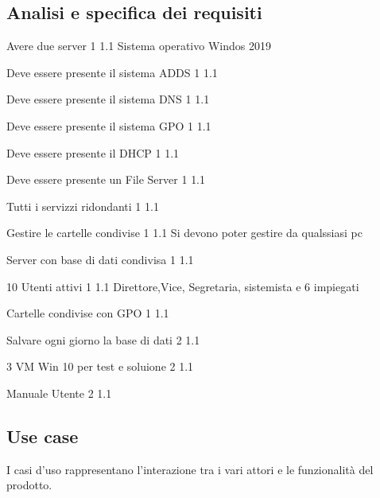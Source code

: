 \documentclass[../main.tex]{subfiles}
\begin{document}
\pagebreak{}
\thispagestyle{header-pages}

\subsection{Analisi e specifica dei requisiti}


    {Avere due server}
    {1}
    {1.1}
    {Sistema operativo Windos 2019}

    {Deve essere presente il sistema ADDS}
    {1}
    {1.1}
    {}

    {Deve essere presente il sistema DNS}
    {1}
    {1.1}
    {}
    
    {Deve essere presente il sistema GPO}
    {1}
    {1.1}
    {}

    {Deve essere presente il DHCP }
    {1}
    {1.1}
    {}
    
\pagebreak{}
\thispagestyle{header-pages}
    {Deve essere presente un File Server }
    {1}
    {1.1}
    {}
    

    {Tutti i servizzi ridondanti}
    {1}
    {1.1}
    {}

    {Gestire le cartelle condivise}
    {1}
    {1.1}
    {Si devono poter gestire da qualssiasi pc}
 
    {Server con base di dati condivisa}
    {1}
    {1.1}
    {}

    {10 Utenti attivi}
    {1}
    {1.1}
    {Direttore,Vice, Segretaria, sistemista e 6 impiegati}
    
\pagebreak{}
\thispagestyle{header-pages}

    {Cartelle condivise con GPO}
    {1}
    {1.1}
    {}

    {Salvare ogni giorno la base di dati}
    {2}
    {1.1}
    {}

    {3 VM Win 10 per test e soluione}
    {2}
    {1.1}
    {}
    
    {Manuale Utente}
    {2}
    {1.1}
    {}



\subsection{Use case}

I casi d’uso rappresentano l’interazione tra i vari attori e le
funzionalità del prodotto.
\end{document}
